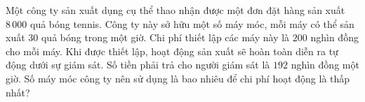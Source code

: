 \begin{ex}%
Một công ty sản xuất dụng cụ thể thao nhận được một đơn đặt hàng sản xuất $8\,000$ quả bóng tennis. Công ty này sở hữu một số máy móc, mỗi máy có thể sản xuất $30$ quả bóng trong một giờ. Chi phí thiết lập các máy này là $200$ nghìn đồng cho mỗi máy. Khi được thiết lập, hoạt động sản xuất sẽ hoàn toàn diễn ra tự động dưới sự giám sát. Số tiền phải trả cho người giám sát là $192$ nghìn đồng một giờ. Số máy móc công ty nên sử dụng là bao nhiêu để chi phí hoạt động là thấp nhất?
\end{ex}

